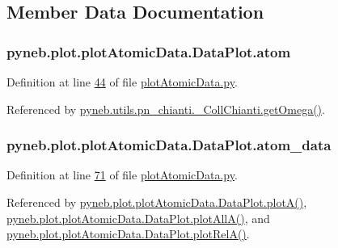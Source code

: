 \subsection{Member Data Documentation}
\hypertarget{classpyneb_1_1plot_1_1plot_atomic_data_1_1_data_plot_af5bbbf002544d1336f7f673a6e777f2e}{}
\subsubsection[{atom}]{\setlength{\rightskip}{0pt plus 5cm}pyneb.\+plot.\+plot\+Atomic\+Data.\+Data\+Plot.\+atom}\label{classpyneb_1_1plot_1_1plot_atomic_data_1_1_data_plot_af5bbbf002544d1336f7f673a6e777f2e}


Definition at line \hyperlink{plot_atomic_data_8py_source_l00044}{44} of file \hyperlink{plot_atomic_data_8py_source}{plot\+Atomic\+Data.\+py}.



Referenced by \hyperlink{pn__chianti_8py_source_l00484}{pyneb.\+utils.\+pn\+\_\+chianti.\+\_\+\+Coll\+Chianti.\+get\+Omega()}.

\hypertarget{classpyneb_1_1plot_1_1plot_atomic_data_1_1_data_plot_aee33ad460a38cb4293a5bd89cec12294}{}
\subsubsection[{atom\+\_\+data}]{\setlength{\rightskip}{0pt plus 5cm}pyneb.\+plot.\+plot\+Atomic\+Data.\+Data\+Plot.\+atom\+\_\+data}\label{classpyneb_1_1plot_1_1plot_atomic_data_1_1_data_plot_aee33ad460a38cb4293a5bd89cec12294}


Definition at line \hyperlink{plot_atomic_data_8py_source_l00071}{71} of file \hyperlink{plot_atomic_data_8py_source}{plot\+Atomic\+Data.\+py}.



Referenced by \hyperlink{plot_atomic_data_8py_source_l00116}{pyneb.\+plot.\+plot\+Atomic\+Data.\+Data\+Plot.\+plot\+A()}, \hyperlink{plot_atomic_data_8py_source_l00188}{pyneb.\+plot.\+plot\+Atomic\+Data.\+Data\+Plot.\+plot\+All\+A()}, and \hyperlink{plot_atomic_data_8py_source_l00261}{pyneb.\+plot.\+plot\+Atomic\+Data.\+Data\+Plot.\+plot\+Rel\+A()}.

